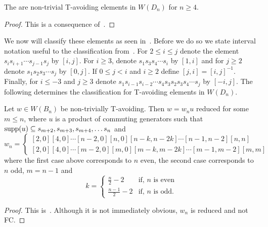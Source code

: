 \begin{proposition}
 The are non-trivial T-avoiding elements in $W(D_n)$ for $n \geq 4$.
\begin{proof}
	This is a consequence of~\cite[Section 2.2]{Gern2013a}. 
\end{proof}
\end{proposition}

We now will classify these elements as seen in~\cite{Gern2013a}. Before we do so we state interval notation useful to the classification from~\cite[Definition 2.3.1]{Gern2013a}. For $2 \leq i \leq j$ denote the element $s_{i}s_{i+1} \cdots s_{j-1}s_j$ by $[i,j]$. For $i \geq 3$, denote $s_1s_3s_4\cdots s_i$ by $[1,i]$ and for $j \geq 2$ denote $s_1s_2s_3 \cdots s_j$ by $[0,j]$. If $0 \leq j <i$ and $i \geq 2$ define $[j,i]=[i,j]^{-1}$. Finally, for $i \leq -3$ and $j \geq 3$ denote $s_1s_{i-1}s_{i-2} \cdots s_4s_3s_2s_3s_4 \cdots s_j$ by $[-i,j]$. The following determines the classification for T-avoiding elements in $W(D_n)$. 

\begin{proposition}
	Let $w \in W(B_n)$ be non-trivially T-avoiding. 
Then $w=w_nu$ reduced for some $m \leq n$, where $u$ is a product of commuting generators such that $\mathrm{supp}(u) \subseteq{s_{m+2}, s_{m+3}, s_{m+4}, \ldots s_n}$ and 
\[ w_n=
\begin{cases}
	[2,0][4,0] \cdots [n-2,0][n,0][n-k,n-2k] \cdots [n-1,n-2][n,n] \\  %
	[2,0][4,0] \cdots [m-2,0][m,0][m-k,m-2k] \cdots [m-1,m-2][m,m]  %
\end{cases}
\] where the first case above corresponds to $n$ even, the second case corresponds to $n$ odd, $m=n-1$ and 
\[
k= 
\begin{cases}
\frac{n}{2}-2 & \text{if, $n$ is even}\\
\frac{n-1}{2}-2 & \text{if, $n$ is odd.}
\end{cases}
\]
\begin{proof}
	This is~\cite[Lemmas 2.2.18 and 2.3.4]{Gern2013a}. Although it is not immediately obvious, $w_n$ is reduced and not FC.
\end{proof}
\end{proposition}

